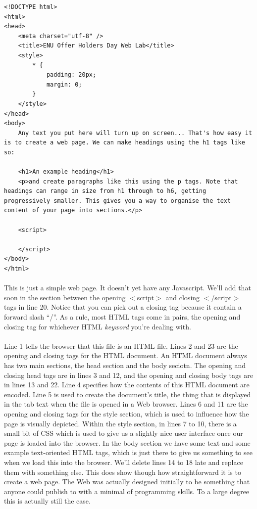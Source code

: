 \documentclass[10pt, a4paper, oneside]{article}
\begin{document}
\begin{lstlisting}
<!DOCTYPE html>
<html>
<head>
    <meta charset="utf-8" />
    <title>ENU Offer Holders Day Web Lab</title>
    <style>
        * { 
            padding: 20px; 
            margin: 0; 
        }
    </style>
</head>
<body>
    Any text you put here will turn up on screen... That's how easy it is to create a web page. We can make headings using the h1 tags like so:

    <h1>An example heading</h1>
    <p>and create paragraphs like this using the p tags. Note that headings can range in size from h1 through to h6, getting progressively smaller. This gives you a way to organise the text content of your page into sections.</p>

    <script>

    </script>
</body>
</html>
\end{lstlisting}

\paragraph{} This is just a simple web page. It doesn't yet have any Javascript. We'll add that soon in the section between the opening $<$script$>$ and closing $<$/script$>$ tags in line 20. Notice that you can pick out a closing tag because it contain a forward slash ``/''. As a rule, most HTML tags come in pairs, the opening and closing tag for whichever HTML \emph{keyword} you're dealing with.

\paragraph{} Line 1 tells the browser that this file is an HTML file. Lines 2 and 23 are the opening and closing tags for the HTML document. An HTML document always has two main sections, the head section and the body seciotn. The opening and closing head tags are in lines 3 and 12, and the opening and closing body tags are in lines 13 and 22. Line 4 specifies how the contents of this HTML document are encoded. Line 5 is used to create the document's title, the thing that is displayed in the tab text when the file is opened in a Web browser. Lines 6 and 11 are the opening and closing tags for the style section, which is used to influence how the page is visually depicted. Within the style section, in lines 7 to 10, there is a small bit of CSS which is used to give us a slightly nice user interface once our page is loaded into the browser. In the body section we have some text and some example text-oriented HTML tags, which is just there to give us something to see when we load this into the browser. We'll delete lines 14 to 18 late and replace them with something else. This does show though how straightforward it is to create a web page. The Web was actually designed initially to be something that anyone could publish to with a minimal of programming skills. To a large degree this is actually still the case.
\end{document}
